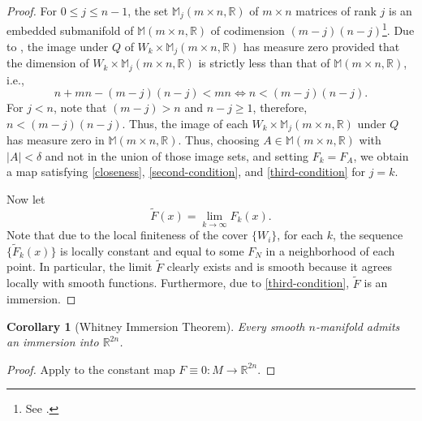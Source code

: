 \documentclass[11pt]{article}
\theoremstyle{thmstyle}
\theoremstyle{defstyle}
\newtheorem{corollary}[theorem]{Corollary}
\newcommand{\R}{\mathbb{R}}
\newcommand{\wt}[1]{\widetilde{#1}}
\renewcommand{\le}{\leqslant}
\renewcommand{\ge}{\geqslant}
\begin{document}
\begin{proof}
	For $0\le j\le n - 1$, the set $\mathbb M_j(m\times n, \R)$ of $m\times n$ matrices of rank $j$ is an embedded submanifold of $\mathbb M(m\times n, \R)$ of codimension $(m - j)(n - j)$\footnote{See \cite[Example 8.14]{lee-smooth-manifolds}.}. Due to , the image under $Q$ of $W_k\times\mathbb M_j(m\times n, \R)$ has measure zero provided that the dimension of $W_k\times\mathbb M_j(m\times n, \R)$ is strictly less than that of $\mathbb M(m\times n, \R)$, i.e., 
	\begin{equation*}
		n + mn - (m - j)(n - j) < mn\iff n < (m - j)(n - j).
	\end{equation*}
	For $j < n$, note that $(m - j) > n$ and $n - j\ge 1$, therefore, $n < (m - j)(n - j)$. Thus, the image of each $W_k\times\mathbb M_j(m\times n, \R)$ under $Q$ has measure zero in $\mathbb M(m\times n, \R)$. Thus, choosing $A\in\mathbb M(m\times n, \R)$ with $|A| < \delta$ and not in the union of those image sets, and setting $F_k = F_A$, we obtain a map satisfying \ref{closeness}, \ref{second-condition}, and \ref{third-condition} for $j = k$.

	Now let 
	\begin{equation*}
		\wt F(x) = \lim_{k\to\infty} F_k(x).
	\end{equation*}
	Note that due to the local finiteness of the cover $\{W_i\}$, for each $k$, the sequence $\{\wt F_k(x)\}$ is locally constant and equal to some $F_N$ in a neighborhood of each point. In particular, the limit $\wt F$ clearly exists and is smooth because it agrees locally with smooth functions. Furthermore, due to \ref{third-condition}, $\wt F$ is an immersion.
\end{proof}

\begin{corollary}[Whitney Immersion Theorem]
	Every smooth $n$-manifold admits an immersion into $\R^{2n}$.
\end{corollary}
\begin{proof}
	Apply  to the constant map $F\equiv 0\colon M\to\R^{2n}$.
\end{proof}
\end{document}
